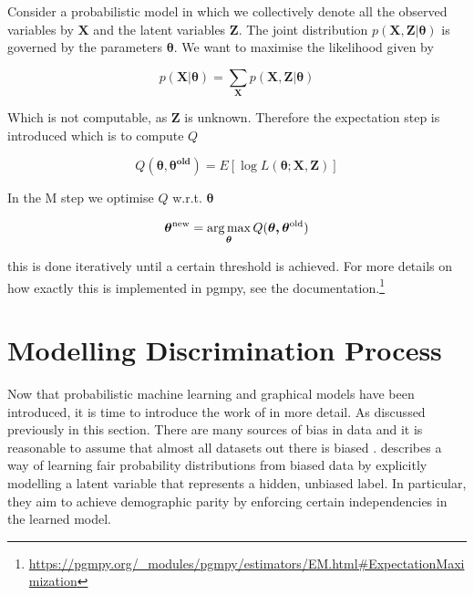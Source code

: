 Consider a probabilistic model in which we collectively denote all the observed
variables by $\boldsymbol{X}$ and the latent variables $\boldsymbol{Z}$. The joint distribution $p(\boldsymbol{X}, \boldsymbol{Z} | \boldsymbol{\theta})$ is governed by the parameters $\boldsymbol{\theta}$. We want to maximise the likelihood given by

\begin{equation*}
    p(\boldsymbol{X} | \boldsymbol{\theta}) = \sum_{\boldsymbol{X}} p(\boldsymbol{X}, \boldsymbol{Z} | \boldsymbol{\theta})
\end{equation*}

Which is not computable, as $\boldsymbol{Z}$ is unknown. Therefore the expectation step is introduced which is to compute $Q$

\begin{equation*}
    Q(\boldsymbol{\theta, \theta^{\text{old}}}) = E[\log L(\boldsymbol{\theta}; \boldsymbol{X}, \boldsymbol{Z})]
\end{equation*}

In the M step we optimise $Q$ w.r.t. $\boldsymbol{\theta}$

\begin{equation*}
    \boldsymbol{\theta^{\text{new}}} = \operatorname*{arg\,max}_{\boldsymbol{\theta}} Q(\boldsymbol{\theta, \theta^{\text{old}}})
\end{equation*}

this is done iteratively until a certain threshold is achieved. For more details on how exactly this is implemented in pgmpy, see the documentation.\footnote{\url{https://pgmpy.org/_modules/pgmpy/estimators/EM.html\#ExpectationMaximization}}

\section{Modelling Discrimination Process}
\label{sec:paper1}
Now that probabilistic machine learning and graphical models have been introduced, it is time to introduce the work of \citet{Choi:2021:AIII} in more detail. As discussed previously in this section. There are many sources of bias in data and it is reasonable to assume that almost all datasets out there is biased \citet{Choi:2021:AIII}. describes a way of learning fair probability distributions from biased data by explicitly modelling a latent variable that represents a hidden, unbiased label. In particular, they aim to achieve demographic parity by enforcing
certain independencies in the learned model.

